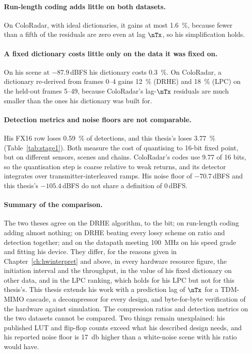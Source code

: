\paragraph{Run-length coding adds little on both datasets.} On ColoRadar, with
ideal dictionaries, it gains at most \SI{1.6}{\percent}, because fewer than a
fifth of the residuals are zero even at lag $\nTx$, so his simplification
holds.

\paragraph{A fixed dictionary costs little only on the data it was fixed on.}
On his scene at $-87.9$\,dBFS his dictionary costs \SI{0.3}{\percent}. On
ColoRadar, a dictionary re-derived from frames 0--4 gains \SI{12}{\percent}
(DRHE) and \SI{18}{\percent} (LPC) on the held-out frames 5--49, because
ColoRadar's lag-$\nTx$ residuals are much smaller than the ones his dictionary
was built for.

\paragraph{Detection metrics and noise floors are not comparable.} His FX16 row
loses \SI{0.59}{\percent} of detections, and this thesis's loses
\SI{3.77}{\percent} (Table~\ref{tab:stage1}). Both measure the cost of
quantising to 16-bit fixed point, but on different sensors, scenes and chains.
ColoRadar's codes use 9.77 of 16 bits, so the quantisation step is coarse
relative to weak returns, and its detector integrates over
transmitter-interleaved ramps. His noise floor of $-70.7$\,dBFS and this
thesis's $-105.4$\,dBFS do not share a definition of 0\,dBFS.

\paragraph{Summary of the comparison.} The two theses agree on the DRHE
algorithm, to the bit; on run-length coding adding almost nothing; on DRHE
beating every lossy scheme on ratio and detection together; and on the
datapath meeting \SI{100}{\mega\hertz} on his speed grade and fitting his
device. They differ, for the reasons given in Chapter~\ref{ch:hwinterpret} and
above, in every hardware resource figure, the initiation interval and the
throughput, in the value of his fixed dictionary on other data, and in the LPC
ranking, which holds for his LPC but not for this thesis's. This thesis extends
his work with a prediction lag of $\nTx$ for a TDM-MIMO cascade, a
decompressor for every design, and byte-for-byte verification of the hardware
against simulation. The compression ratios and detection metrics on the two
datasets cannot be compared. Two things remain unexplained: his published LUT
and flip-flop counts exceed what his described design needs, and his reported
noise floor is \SI{17}{\decibel} higher than a white-noise scene with his ratio
would have.
\label{ch:vskiem:end}
